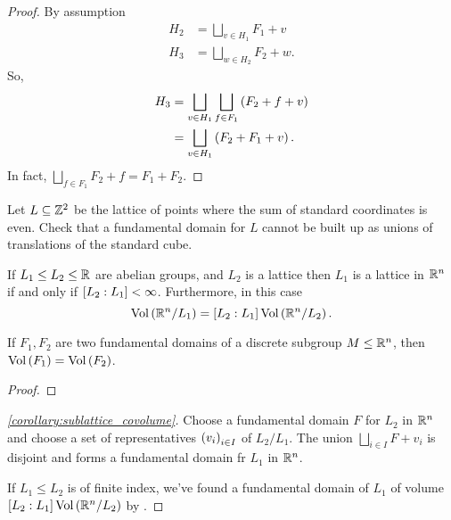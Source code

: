 \documentclass[11pt]{karticle}
\begin{document}
\begin{proof}
By assumption
\begin{align*}
H_2 &= \bigsqcup_{v \in H_1} F_1 + v \\
H_3 &= \bigsqcup_{w \in H_2} F_2 + w \text{.}
\end{align*}
So,
\begin{align*}
H_3 &= \bigsqcup_{v \in H_1} \bigsqcup_{f \in F_1} \left( F_2 + f + v \right)
\\&= \bigsqcup_{v \in H_1} \left( F_2 + F_1 + v \right) \text{.}
\end{align*}
In fact, $\bigsqcup_{f \in F_1} F_2 + f = F_1 + F_2$.
\end{proof}

\begin{exercise}
Let $L \subseteq \mathbb{Z}^2$ be the lattice of points where the sum of standard coordinates is even. Check that a fundamental domain for $L$ cannot be built up as unions of translations of the standard cube.
\end{exercise}

\begin{corollary}\label{corollary:sublattice_covolume}
If $L_1 \leq L_2 \leq \mathbb{R}$ are abelian groups, and $L_2$ is a lattice then $L_1$ is a lattice in $\mathbb{R}^n$ if and only if $\left[ L_2 : L_1 \right] < \infty$.
Furthermore, in this case
\[\mathrm{Vol}\left( \mathbb{R}^n / L_1 \right) = \left[ L_2 : L_1 \right] \mathrm{Vol}\left( \mathbb{R}^n / L_2 \right) \text{.}\]
\end{corollary}

\begin{lemma}\label{lemma:fd_volume}
If $F_1, F_2$ are two fundamental domains of a discrete subgroup $M \leq \mathbb{R}^n$, then $\mathrm{Vol}\left( F_1 \right) = \mathrm{Vol}\left( F_2 \right)$.
\end{lemma}

\begin{proof}
\end{proof}

\begin{proof}[\ref{corollary:sublattice_covolume}]
Choose a fundamental domain $F$ for $L_2$ in $\mathbb{R}^n$ and choose a set of representatives $\left( v_i \right)_{i \in I}$ of $L_2 / L_1$. The union $\bigsqcup_{i \in I} F + v_i$ is disjoint and forms a fundamental domain fr $L_1$ in $\mathbb{R}^n$.

If $L_1 \leq L_2$ is of finite index, we've found a fundamental domain of $L_1$ of volume $\left[ L_2 : L_1 \right] \mathrm{Vol}\left( \mathbb{R}^n / L_2 \right)$ by . 
\end{proof}




\printbibliography
\end{document}
